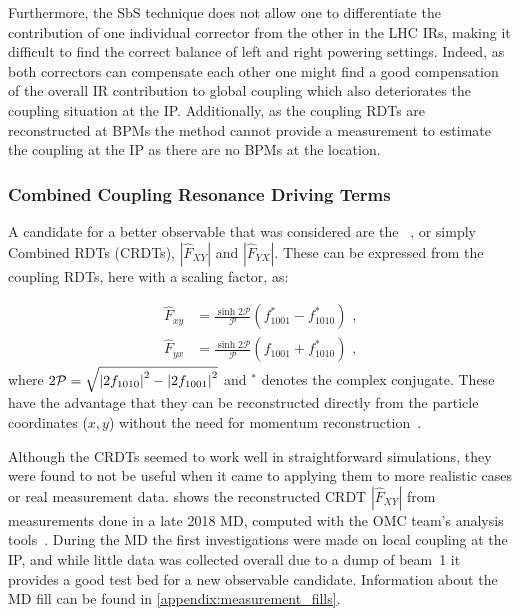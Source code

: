Furthermore, the SbS technique does not allow one to differentiate the contribution of one individual corrector from the other in the LHC IRs, making it difficult to find the correct balance of left and right powering settings.
Indeed, as both correctors can compensate each other one might find a good compensation of the overall IR contribution to global coupling which also deteriorates the coupling situation at the IP.
Additionally, as the coupling RDTs are reconstructed at BPMs the method cannot provide a measurement to estimate the coupling at the IP as there are no BPMs at the location.

\subsubsection*{Combined Coupling Resonance Driving Terms}

A candidate for a better observable that was considered are the ~\cite{PRAB:Franchi:First_Simultaneous}, or simply Combined RDTs (CRDTs), \(|\hat{F}_{XY}|\) and \(|\hat{F}_{YX}|\).
These can be expressed from the coupling RDTs, here with a scaling factor, as:

\begin{equation}
    \begin{aligned}
        \hat{F}_{xy} &= \frac{\sinh{2 \mathcal{P}}}{\mathcal{P}} \left( f^{\ast}_{1001} - f^{\ast}_{1010} \right)  \text{ ,} \\
        \hat{F}_{yx} &= \frac{\sinh{2 \mathcal{P}}}{\mathcal{P}} \left( f_{1001} + f^{\ast}_{1010} \right)         \text{ ,}
    \end{aligned}
    \label{equation:combined_coupling_rdts}
\end{equation}
where \(2 \mathcal{P} = \sqrt{\left\lvert 2 f_{1010} \right\rvert^2 - \left\lvert 2 f_{1001} \right\rvert^2}\) and \(^{\ast}\) denotes the complex conjugate.
These have the advantage that they can be reconstructed directly from the particle coordinates (\(x,y\)) without the need for momentum reconstruction~\cite{PRAB:Hofer:Coupling_Local_Observables}.
\newline

Although the CRDTs seemed to work well in straightforward simulations, they were found to not be useful when it came to applying them to more realistic cases or real measurement data.
 shows the reconstructed CRDT \(|\hat{F}_{XY}|\) from measurements done in a late \num{2018} MD, computed with the OMC team's analysis tools~\cite{CODE:OMC:omc3}.
During the MD the first investigations were made on local coupling at the IP, and while little data was collected overall due to a dump of beam~\num{1} it provides a good test bed for a new observable candidate.
Information about the MD fill can be found in \cref{appendix:measurement_fills}.


